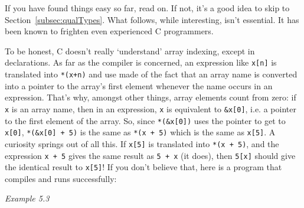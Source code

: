    If you have found things easy so far, read on. If not, it's a good
    idea to skip to Section~\ref{subsec:qualTypes}. What follows, while
    interesting, isn't essential. It has been known to frighten even
    experienced C programmers.


   To be honest, C doesn't really `understand' array indexing,
    except in declarations. As far as the compiler is concerned, an
    expression like \texttt{x[n]} is translated into \texttt{*(x+n)}
    and use made of the fact that an array name is converted into a pointer
    to the array's first element whenever the name occurs in an expression.
    That's why, amongst other things, array elements count from zero: if
    \texttt{x} is an array name, then in an expression, \texttt{x}
    is equivalent to \texttt{\&x[0]}, i.e. a pointer to the first
    element of the array. So, since \texttt{*(\&x[0])} uses the
    pointer to get to \texttt{x[0]}, \texttt{*(\&x[0] + 5)} is
    the same as \texttt{*(x + 5)} which is the same as
    \texttt{x[5]}. A curiosity springs out of all this. If
    \texttt{x[5]} is translated into \texttt{*(x + 5)}, and the
    expression \texttt{x + 5} gives the same result as \texttt{5
    + x} (it does), then \texttt{5[x]} should give the identical
    result to \texttt{x[5]}! If you don't believe that, here is
    a program that compiles and runs successfully:


    \begin{center}\textit{Example 5.3}\end{center}


